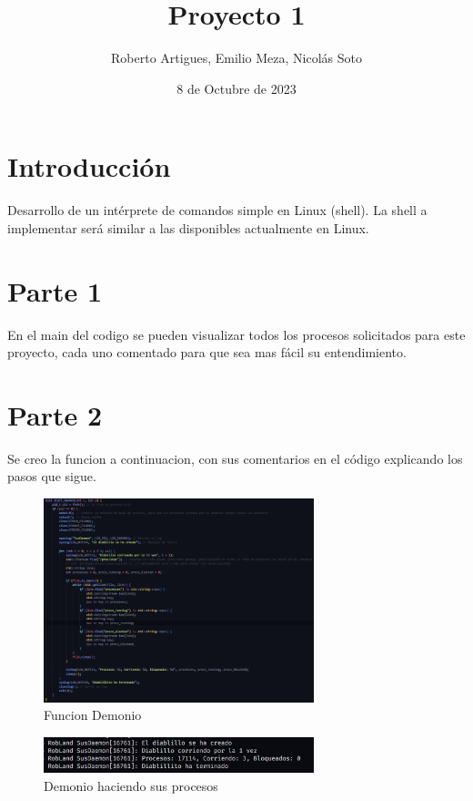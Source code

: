 \documentclass[12pt]{article}
\begin{document}
\title{Proyecto 1}
\author{Roberto Artigues, Emilio Meza, Nicolás Soto}
\date{8 de Octubre de 2023}
\maketitle


\section{Introducción}
Desarrollo de un intérprete de comandos simple en Linux (shell). La shell a implementar será similar
a las disponibles actualmente en Linux.
\section{Parte 1}
En el main del codigo se pueden visualizar todos los procesos solicitados para este proyecto, 
cada uno comentado para que sea mas fácil su entendimiento.


\section{Parte 2}
Se creo la funcion a continuacion, con sus comentarios en el código explicando los pasos que sigue.
\begin{figure}[H]
    \centering
    \includegraphics[width=0.7\textwidth]{daemon.png}
    \caption{Funcion Demonio}
\end{figure}
\begin{figure}[H]
    \centering
    \includegraphics[width=0.7\textwidth]{demonio-working.jpeg}
    \caption{Demonio haciendo sus procesos}
\end{figure}
\end{document}
